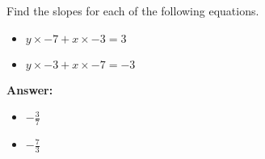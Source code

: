  Find the slopes for each of the following equations. \begin{itemize}\item \( y \times -7 + x \times -3 = 3 \)\item \( y \times -3 + x \times -7 = -3 \)\end{itemize}

        \textbf{Answer:} \begin{itemize}\item \( -\frac{3}{7} \)\item \( -\frac{7}{3} \)\end{itemize}
